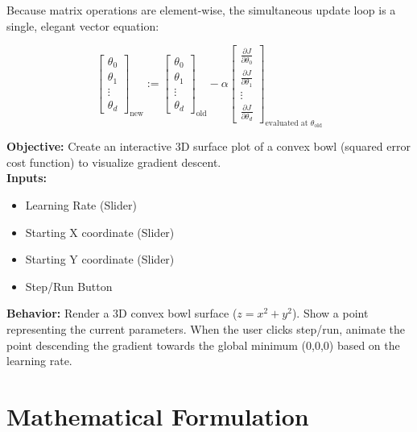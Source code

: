 \documentclass[12pt, a4paper]{report}
\begin{document}
Because matrix operations are element-wise, the simultaneous update loop is a single, elegant vector equation:

\[
\begin{bmatrix} \theta_0 \\ \theta_1 \\ \vdots \\ \theta_d \end{bmatrix}_{\text{new}} := \begin{bmatrix} \theta_0 \\ \theta_1 \\ \vdots \\ \theta_d \end{bmatrix}_{\text{old}} - \alpha \begin{bmatrix} \frac{\partial J}{\partial \theta_0} \\ \frac{\partial J}{\partial \theta_1} \\ \vdots \\ \frac{\partial J}{\partial \theta_d} \end{bmatrix}_{\text{evaluated at } \theta_{\text{old}}}
\]

\vspace{1em}

\begin{tcolorbox}[title=Interactive Widget Placeholder: Gradient Descent 3D Visualizer, colback=blue!5, colframe=blue!50!black]
\textbf{Objective:} Create an interactive 3D surface plot of a convex bowl (squared error cost function) to visualize gradient descent.\\
\textbf{Inputs:}
\begin{itemize}
    \item Learning Rate (Slider)
    \item Starting X coordinate (Slider)
    \item Starting Y coordinate (Slider)
    \item Step/Run Button
\end{itemize}
\textbf{Behavior:} Render a 3D convex bowl surface ($z = x^2 + y^2$). Show a point representing the current parameters. When the user clicks step/run, animate the point descending the gradient towards the global minimum (0,0,0) based on the learning rate.
\end{tcolorbox}

\section{Mathematical Formulation}
\end{document}
